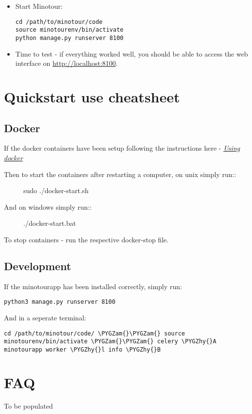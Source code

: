 \documentclass[letterpaper,10pt,english]{sphinxmanual}
\def\PYGZam{\char`\&}
\def\PYGZhy{\char`\-}
\begin{document}
\begin{itemize}
\item {} 
Start Minotour:

\begin{Verbatim}[commandchars=\\\{\}]
cd /path/to/minotour/code
source minotourenv/bin/activate
python manage.py runserver 8100
\end{Verbatim}

\item {} 
Time to test - if everything worked well, you should be able to access the web interface on \href{http://localhost:8100}{http://localhost:8100}.

\end{itemize}


\chapter{Quickstart use cheatsheet}
\label{quickstart:quickstart-use-cheatsheet}\label{quickstart::doc}

\section{Docker}
\label{quickstart:docker}
If the docker containers have been setup following the instructions here - {\hyperref[docker::doc]{\emph{\emph{Using docker}}}}
\begin{description}
\item[{Then to start the containers after restarting a computer, on unix simply run::}] \leavevmode
sudo ./docker-start.sh

\item[{And on windows simply run::}] \leavevmode
./docker-start.bat

\end{description}

To stop containers - run the respective docker-stop file.


\section{Development}
\label{quickstart:development}
If the minotourapp has been installed correctly, simply run:

\begin{Verbatim}[commandchars=\\\{\}]
python3 manage.py runserver 8100
\end{Verbatim}

And in a seperate terminal:

\begin{Verbatim}[commandchars=\\\{\}]
cd /path/to/minotour/code/ \PYGZam{}\PYGZam{} source minotourenv/bin/activate \PYGZam{}\PYGZam{} celery \PYGZhy{}A minotourapp worker \PYGZhy{}l info \PYGZhy{}B
\end{Verbatim}


\chapter{FAQ}
\label{faqs:faq}\label{faqs::doc}
To be populated



\renewcommand{\indexname}{Index}
\printindex
\end{document}
